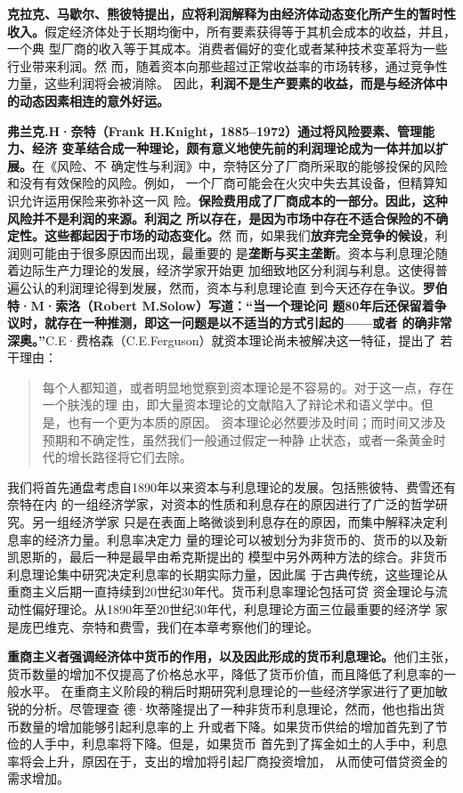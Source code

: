 \textbf{克拉克、马歇尔、熊彼特提出，应将利润解释为由经济体动态变化所产生的暂时性
  收入。}假定经济体处于长期均衡中，所有要素获得等于其机会成本的收益，并且，一个典
型厂商的收入等于其成本。消费者偏好的变化或者某种技术变革将为一些行业带来利润。然
而，随着资本向那些超过正常收益率的市场转移，通过竞争性力量，这些利润将会被消除。
因此，\textbf{利润不是生产要素的收益，而是与经济体中的动态因素相连的意外好运。}

\textbf{弗兰克.H·奈特（Frank H.Knight，1885--1972）通过将风险要素、管理能力、经济
  变革结合成一种理论，颇有意义地使先前的利润理论成为一体并加以扩展。}在《风险、不
确定性与利润》中，奈特区分了厂商所采取的能够投保的风险和没有有效保险的风险。例如，
一个厂商可能会在火灾中失去其设备，但精算知识允许运用保险来弥补这一风
险。\textbf{保险费用成了厂商成本的一部分。因此，这种风险并不是利润的来源。利润之
  所以存在，是因为市场中存在不适合保险的不确定性。这些都起因于市场的动态变化。}然
而，如果我们\textbf{放弃完全竞争的候设}，利润则可能由于很多原因而出现，最重要的
是\textbf{垄断与买主垄断}。资本与利息理沦随着边际生产力理论的发展，经济学家开始更
加细致地区分利润与利息。这使得普遍公认的利润理论得到发展，然而，资本与利息理论直
到今天还存在争议。\textbf{罗伯特·M·索洛（Robert M.Solow）写道：“当一个理论问
  题80年后还保留着争议时，就存在一种推测，即这一问题是以不适当的方式引起的——或者
  的确非常深奥。”}C.E·费格森（C.E.Ferguson）就资本理论尚未被解决这一特征，提出了
若干理由：
\begin{quotation}
  每个人都知道，或者明显地觉察到资本理论是不容易的。对于这一点，存在一个肤浅的理
  由，即大量资本理论的文献陷入了辩论术和语义学中。但是，也有一个更为本质的原因。
  资本理论必然要涉及时间；而时间又涉及预期和不确定性，虽然我们一般通过假定一种静
  止状态，或者一条黄金时代的增长路径将它们去除。
\end{quotation}

我们将首先通盘考虑自1890年以来资本与利息理论的发展。包括熊彼特、费雪还有奈特在内
的一组经济学家，对资本的性质和利息存在的原因进行了广泛的哲学研究。另一组经济学家
只是在表面上略微谈到利息存在的原因，而集中解释决定利息率的经济力量。利息率决定力
量的理论可以被划分为非货币的、货币的以及新凯恩斯的，最后一种是最早由希克斯提出的
模型中另外两种方法的综合。非货币利息理论集中研究决定利息率的长期实际力量，因此属
于古典传统，这些理论从重商主义后期一直持续到20世纪30年代。货币利息率理论包括可贷
资金理论与流动性偏好理论。从1890年至20世纪30年代，利息理论方面三位最重要的经济学
家是庞巴维克、奈特和费雪，我们在本章考察他们的理论。

\textbf{重商主义者强调经济体中货币的作用，以及因此形成的货币利息理论。}他们主张，
货币数量的增加不仅提高了价格总水平，降低了货币价值，而且降低了利息率的一般水平。
在重商主义阶段的稍后时期研究利息理论的一些经济学家进行了更加敏锐的分析。尽管理查
德·坎蒂隆提出了一种非货币利息理论，然而，他也指出货币数量的增加能够引起利息率的上
升或者下降。如果货币供给的增加首先到了节俭的人手中，利息率将下降。但是，如果货币
首先到了挥金如土的人手中，利息率将会上升，原因在于，支出的增加将引起厂商投资增加，
从而使可借贷资金的需求增加。

